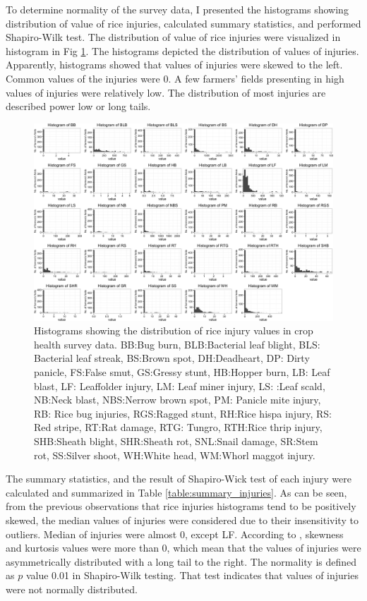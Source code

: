 To determine normality of the survey data, I presented the histograms showing distribution of value of rice injuries, calculated summary statistics, and performed Shapiro-Wilk test. The distribution of value of rice injuries were visualized in histogram in Fig \ref{fig:allhisto}. The histograms depicted the distribution of values of injuries. Apparently, histograms showed that values of injuries were skewed to the left. Common values of the injuries were 0. A few farmers’ fields presenting in high values of injuries were relatively low. The distribution of most injuries are described power low or long tails. 

\begin{landscape}
\begin{figure}[!h]
\centering
\includegraphics[width = 1\textwidth]{figures/allhisto2/allhisto2.png}
\caption{Histograms showing the distribution of rice injury values in crop health survey data. BB:Bug burn, BLB:Bacterial leaf blight, BLS: Bacterial leaf streak, BS:Brown spot, DH:Deadheart, DP: Dirty panicle, FS:False smut, GS:Gressy stunt, HB:Hopper burn, LB: Leaf blast, LF: Leaffolder injury, LM: Leaf miner injury, LS: :Leaf scald, NB:Neck blast, NBS:Nerrow brown spot, PM: Panicle mite injury, RB: Rice bug injuries, RGS:Ragged stunt, RH:Rice hispa injury, RS: Red stripe, RT:Rat damage, RTG: Tungro, RTH:Rice thrip injury, SHB:Sheath blight, SHR:Sheath rot, SNL:Snail damage, SR:Stem rot, SS:Silver shoot, WH:White head, WM:Whorl maggot injury.}
\label{fig:allhisto}
\end{figure}
\end{landscape}



The summary statistics, and the result of Shapiro-Wick test of each injury were calculated and summarized in Table \ref{table:summary_injuries}.  As can be seen, from the previous observations that rice injuries histograms tend to be positively skewed, the median values of injuries were considered due to their insensitivity to outliers. Median of injuries were almost 0, except LF. According to \citet{Doane_2011_Measuring}, skewness and kurtosis values were more than 0, which mean that the values of injuries were asymmetrically distributed with a long tail to the right. The normality is defined as $p$ value 0.01 in Shapiro-Wilk testing. That test indicates that values of injuries were not normally distributed.

